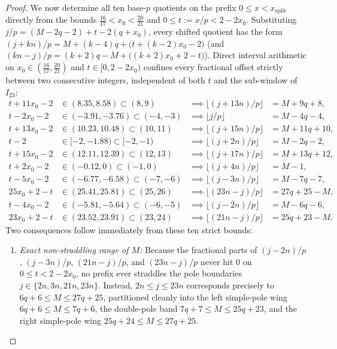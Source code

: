 \documentclass[11pt,reqno]{amsart}
\theoremstyle{definition}
\theoremstyle{remark}
\begin{document}
\begin{proof}
We now determine all ten base-$p$ quotients on the prefix $0 \le x < x_{\mathrm{split}}$ directly from the bounds $\frac{16}{17} < x_0 < \frac{20}{21}$ and $0 \le t := x/p < 2 - 2x_0$. Substituting $j/p = (M - 2q - 2) + t - 2(q + x_0)$, every shifted quotient has the form $(j + k n)/p = M + (k - 4)q + \bigl(t + (k - 2)x_0 - 2\bigr)$ (and $(kn - j)/p = (k + 2)q - M + \bigl((k + 2)x_0 + 2 - t\bigr)$). Direct interval arithmetic on $x_0 \in (\frac{16}{17}, \frac{20}{21})$ and $t \in [0, 2 - 2x_0)$ confines every fractional offset strictly between two consecutive integers, independent of both $t$ and the sub-window of $I_{23}$:
\begin{align*}
  t + 11x_0 - 2 &\in (8.35, 8.58) \subset (8, 9)   &\implies \lfloor (j+13n)/p \rfloor &= M + 9q + 8, \\
  t - 2x_0 - 2  &\in (-3.91, -3.76) \subset (-4,-3) &\implies \lfloor j/p \rfloor       &= M - 4q - 4, \\
  t + 13x_0 - 2 &\in (10.23, 10.48) \subset (10,11) &\implies \lfloor (j+15n)/p \rfloor &= M + 11q + 10, \\
  t - 2         &\in [-2, -1.88) \subset [-2, -1)   &\implies \lfloor (j+2n)/p \rfloor  &= M - 2q - 2, \\
  t + 15x_0 - 2 &\in (12.11, 12.39) \subset (12,13) &\implies \lfloor (j+17n)/p \rfloor &= M + 13q + 12, \\
  t + 2x_0 - 2  &\in (-0.12, 0) \subset (-1, 0)     &\implies \lfloor (j+4n)/p \rfloor  &= M - 1, \\
  t - 5x_0 - 2  &\in (-6.77, -6.58) \subset (-7,-6) &\implies \lfloor (j-3n)/p \rfloor  &= M - 7q - 7, \\
  25x_0 + 2 - t &\in (25.41, 25.81) \subset (25,26) &\implies \lfloor (23n-j)/p \rfloor &= 27q + 25 - M, \\
  t - 4x_0 - 2  &\in (-5.81, -5.64) \subset (-6,-5) &\implies \lfloor (j-2n)/p \rfloor  &= M - 6q - 6, \\
  23x_0 + 2 - t &\in (23.52, 23.91) \subset (23,24) &\implies \lfloor (21n-j)/p \rfloor &= 25q + 23 - M.
\end{align*}
Two consequences follow immediately from these ten strict bounds:
\begin{enumerate}
  \item \emph{Exact non-straddling range of $M$:} Because the fractional parts of $(j - 2n)/p$, $(j - 3n)/p$, $(21n - j)/p$, and $(23n - j)/p$ never hit $0$ on $0 \le t < 2 - 2x_0$, no prefix ever straddles the pole boundaries $j \in \{2n, 3n, 21n, 23n\}$. Instead, $2n \le j \le 23n$ corresponds precisely to $6q + 6 \le M \le 27q + 25$, partitioned cleanly into the left simple-pole wing $6q + 6 \le M \le 7q + 6$, the double-pole band $7q + 7 \le M \le 25q + 23$, and the right simple-pole wing $25q + 24 \le M \le 27q + 25$.

\end{enumerate}
\end{proof}
\end{document}
